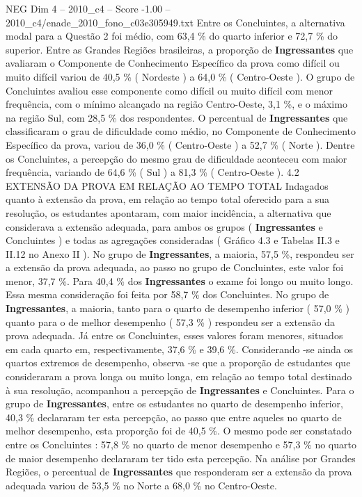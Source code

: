 \begin{textsample}{NEG Dim 4 – 2010\_c4 – Score -1.00 – 2010\_c4/enade\_2010\_fono\_c03e305949.txt}
Entre os Concluintes, a alternativa modal para a Questão 2 foi médio, com 63,4 \% do quarto inferior e 72,7 \% do superior.
Entre as Grandes Regiões brasileiras, a proporção de \textbf{Ingressantes} que avaliaram o Componente de Conhecimento Específico da prova como difícil ou muito difícil variou de 40,5 \% ( Nordeste ) a 64,0 \% ( Centro-Oeste ).
O grupo de Concluintes avaliou esse componente como difícil ou muito difícil com menor frequência, com o mínimo alcançado na região Centro-Oeste, 3,1 \%, e o máximo na região Sul, com 28,5 \% dos respondentes.
O percentual de \textbf{Ingressantes} que classificaram o grau de dificuldade como médio, no Componente de Conhecimento Específico da prova, variou de 36,0 \% ( Centro-Oeste ) a 52,7 \% ( Norte ).
Dentre os Concluintes, a percepção do mesmo grau de dificuldade aconteceu com maior frequência, variando de 64,6 \% ( Sul ) a 81,3 \% ( Centro-Oeste ). 4.2 EXTENSÃO DA PROVA EM RELAÇÃO AO TEMPO TOTAL Indagados quanto à extensão da prova, em relação ao tempo total oferecido para a sua resolução, os estudantes apontaram, com maior incidência, a alternativa que considerava a extensão adequada, para ambos os grupos ( \textbf{Ingressantes} e Concluintes ) e todas as agregações consideradas ( Gráfico 4.3 e Tabelas II.3 e II.12 no Anexo II ).
No grupo de \textbf{Ingressantes}, a maioria, 57,5 \%, respondeu ser a extensão da prova adequada, ao passo no grupo de Concluintes, este valor foi menor, 37,7 \%.
Para 40,4 \% dos \textbf{Ingressantes} o exame foi longo ou muito longo.
Essa mesma consideração foi feita por 58,7 \% dos Concluintes.
No grupo de \textbf{Ingressantes}, a maioria, tanto para o quarto de desempenho inferior ( 57,0 \% ) quanto para o de melhor desempenho ( 57,3 \% ) respondeu ser a extensão da prova adequada.
Já entre os Concluintes, esses valores foram menores, situados em cada quarto em, respectivamente, 37,6 \% e 39,6 \%.
Considerando -se ainda os quartos extremos de desempenho, observa -se que a proporção de estudantes que consideraram a prova longa ou muito longa, em relação ao tempo total destinado à sua resolução, acompanhou a percepção de \textbf{Ingressantes} e Concluintes.
Para o grupo de \textbf{Ingressantes}, entre os estudantes no quarto de desempenho inferior, 40,3 \% declararam ter esta percepção, ao passo que entre aqueles no quarto de melhor desempenho, esta proporção foi de 40,5 \%.
O mesmo pode ser constatado entre os Concluintes : 57,8 \% no quarto de menor desempenho e 57,3 \% no quarto de maior desempenho declararam ter tido esta percepção.
Na análise por Grandes Regiões, o percentual de \textbf{Ingressantes} que responderam ser a extensão da prova adequada variou de 53,5 \% no Norte a 68,0 \% no Centro-Oeste.

\end{textsample}
